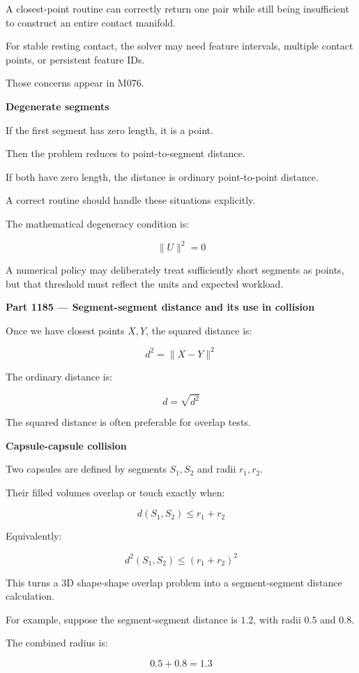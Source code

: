 A closest-point routine can correctly return one pair while still being insufficient to construct an entire contact manifold.

For stable resting contact, the solver may need feature intervals, multiple contact points, or persistent feature IDs.

Those concerns appear in M076.

\textbf{Degenerate segments}

If the first segment has zero length, it is a point.

Then the problem reduces to point-to-segment distance.

If both have zero length, the distance is ordinary point-to-point distance.

A correct routine should handle these situations explicitly.

The mathematical degeneracy condition is:

\[
\|U\|^2=0
\]

A numerical policy may deliberately treat sufficiently short segments as points, but that threshold must reflect the units and expected workload.

\textbf{Part 1185 --- Segment-segment distance and its use in collision}

Once we have closest points \(X,Y\), the squared distance is:

\[
\boxed{d^2=\|X-Y\|^2}
\]

The ordinary distance is:

\[
\boxed{d=\sqrt{d^2}}
\]

The squared distance is often preferable for overlap tests.

\textbf{Capsule-capsule collision}

Two capsules are defined by segments \(S_1,S_2\) and radii \(r_1,r_2\).

Their filled volumes overlap or touch exactly when:

\[
\boxed{ d(S_1,S_2)\le r_1+r_2 }
\]

Equivalently:

\[
\boxed{ d^2(S_1,S_2)\le(r_1+r_2)^2 }
\]

This turns a 3D shape-shape overlap problem into a segment-segment distance calculation.

For example, suppose the segment-segment distance is \(1.2\), with radii \(0.5\) and \(0.8\).

The combined radius is:

\[
0.5+0.8=1.3
\]


